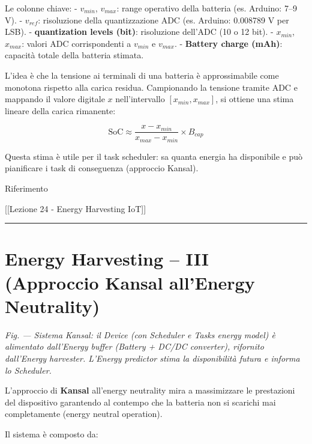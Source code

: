 \documentclass[
  italian,
  openany]{book}
\begin{document}
Le colonne chiave: - \(v_{min}\), \(v_{max}\): range operativo della
batteria (es. Arduino: 7--9 V). - \(v_{ref}\): risoluzione della
quantizzazione ADC (es. Arduino: 0.008789 V per LSB). -
\textbf{quantization levels (bit)}: risoluzione dell'ADC (10 o 12 bit).
- \(x_{min}\), \(x_{max}\): valori ADC corrispondenti a \(v_{min}\) e
\(v_{max}\). - \textbf{Battery charge (mAh)}: capacità totale della
batteria stimata.

L'idea è che la tensione ai terminali di una batteria è approssimabile
come monotona rispetto alla carica residua. Campionando la tensione
tramite ADC e mappando il valore digitale \(x\) nell'intervallo
\([x_{min}, x_{max}]\), si ottiene una stima lineare della carica
rimanente:

\[\text{SoC} \approx \frac{x - x_{min}}{x_{max} - x_{min}} \times B_{cap}\]

Questa stima è utile per il task scheduler: sa quanta energia ha
disponibile e può pianificare i task di conseguenza (approccio Kansal).

\begin{calloutnote}{Riferimento}

{[}{[}Lezione 24 - Energy Harvesting IoT{]}{]}

\end{calloutnote}

\begin{center}\rule{0.5\linewidth}{0.5pt}\end{center}

\section{Energy Harvesting -- III (Approccio Kansal all'Energy
Neutrality)}\label{energy-harvesting-iii-approccio-kansal-allenergy-neutrality}

\emph{Fig. --- Sistema Kansal: il Device (con Scheduler e Tasks energy
model) è alimentato dall'Energy buffer (Battery + DC/DC converter),
rifornito dall'Energy harvester. L'Energy predictor stima la
disponibilità futura e informa lo Scheduler.}

L'approccio di \textbf{Kansal} all'energy neutrality mira a massimizzare
le prestazioni del dispositivo garantendo al contempo che la batteria
non si scarichi mai completamente (energy neutral operation).

Il sistema è composto da:
\end{document}
